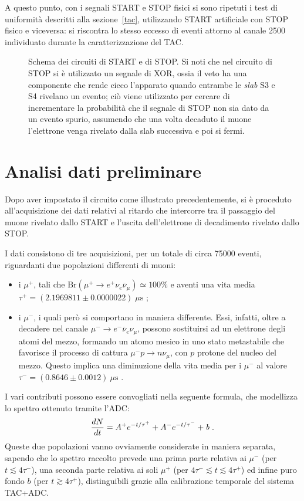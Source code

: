 \documentclass[10pt, oneside, a4paper]{article}   	%
\begin{document}
A questo punto, con i segnali START e STOP fisici si sono ripetuti i test di uniformità descritti alla sezione~\ref{tac}, utilizzando START artificiale con STOP fisico e viceversa: si riscontra lo stesso eccesso di eventi attorno al canale 2500 individuato durante la caratterizzazione del TAC.
%
\begin{figure}[h]
	\centering
	
	\caption{Schema dei circuiti di START e di STOP. Si noti che nel circuito di STOP si è utilizzato un segnale di XOR, ossia il veto ha una componente che rende cieco l'apparato quando entrambe le \emph{slab} S3 e S4 rivelano un evento; ciò viene utilizzato per cercare di incrementare la probabilità che il segnale di STOP non sia dato da un evento spurio, assumendo che una volta decaduto il muone l'elettrone venga rivelato dalla slab successiva e poi si fermi.}
	\label{scemi}
\end{figure}
%
\section{Analisi dati preliminare}\label{analPrelim}
Dopo aver impostato il circuito come illustrato precedentemente, si è proceduto all'acquisizione dei dati relativi al ritardo che intercorre tra il passaggio del muone rivelato dallo START e l'uscita dell'elettrone di decadimento rivelato dallo STOP.

I dati consistono di tre acquisizioni, per un totale di circa 75000 eventi, riguardanti due popolazioni differenti di muoni:
\begin{itemize}
  \item i $\mu^+$, tali che $\mbox{Br}(\mu^+ \to e^+\nu_e\overline{\nu}_\mu)\simeq 100 \%$ e aventi una vita media \linebreak $\tau^+=(2.1969811 \pm 0.0000022)\;\mu\mbox{s}$ \cite{pdg};
  \item i $\mu^-$, i quali però si comportano in maniera differente. Essi, infatti, oltre a decadere nel canale $\mu^-\to e^-\overline{\nu}_e\nu_\mu$, possono sostituirsi ad un elettrone degli atomi del mezzo, formando un atomo mesico in uno stato metastabile che favorisce il processo di cattura $\mu^-p\to n\nu_\mu $, con $p$ protone del nucleo del mezzo. Questo implica una diminuzione della vita media per i $\mu^-$ al valore $\tau^-=(0.8646 \pm 0.0012) \ \mu \mbox{s}$ \cite{al}.
\end{itemize}

I vari contributi possono essere convogliati nella seguente formula, che modellizza lo spettro ottenuto tramite l'ADC:
 \[\frac{dN}{dt} = A^+ e^{-t/\tau^+} + A^- e^{-t/\tau^-} + \mbox{\emph{b\;.}} \]
Queste due popolazioni vanno ovviamente considerate in maniera separata, sapendo che lo spettro raccolto prevede una prima parte relativa ai $\mu^-$ (per $t\lesssim4\tau^-$), una seconda parte relativa ai soli $\mu^+$ (per $4\tau^-\lesssim t\lesssim 4\tau^+$) ed infine puro fondo $b$ (per $t\gtrsim4\tau^+$), distinguibili grazie alla calibrazione temporale del sistema TAC+ADC.
\end{document}
